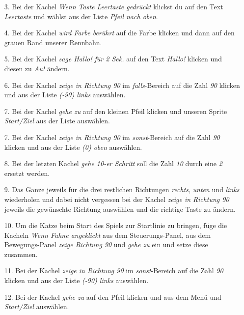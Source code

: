 \begin{itemize}
\item[3. ] Bei der Kachel \textit{Wenn Taste Leertaste gedrückt} klickst du auf den Text \textit{Leertaste} und w{\"a}hlst aus der Liste \textit{Pfeil nach oben}.
\item[4. ] Bei der Kachel \textit{wird Farbe berührt} auf die Farbe klicken und dann auf den grauen Rand unserer Rennbahn.
\item[5. ] Bei der Kachel \textit{sage Hallo! für 2 Sek.} auf den Text \textit{Hallo!} klicken und diesen zu \textit{Au!} ändern.
\item[6. ] Bei der Kachel \textit{zeige in Richtung 90} im \textit{falls}-Bereich auf die Zahl \textit{90} klicken und aus der Liste \textit{(-90) links} auswählen.
\item[7. ] Bei der Kachel \textit{gehe zu} auf den kleinen Pfeil klicken und unseren Sprite \textit{Start/Ziel} aus der Liste auswählen.
\item[7. ] Bei der Kachel \textit{zeige in Richtung 90} im \textit{sonst}-Bereich auf die Zahl \textit{90} klicken und aus der Liste \textit{(0) oben} auswählen.
\item[8. ] Bei der letzten Kachel \textit{gehe 10-er Schritt} soll die Zahl \textit{10} durch eine \textit{2} ersetzt werden.
\end{itemize}


\begin{itemize}
\item[9. ] Das Ganze jeweils für die drei restlichen Richtungen \textit{rechts}, \textit{unten} und \textit{links} wiederholen und dabei nicht vergessen bei der Kachel \textit{zeige in Richtung 90} jeweils die gewünschte Richtung auswählen und die richtige Taste zu ändern.
\end{itemize}


\begin{itemize}
\item[10. ] Um die Katze beim Start des Spiels zur Startlinie zu bringen, füge die Kacheln \textit{Wenn Fahne angeklickt} aus dem Steuerungs-Panel, aus dem Bewegungs-Panel \textit{zeige Richtung 90} und \textit{gehe zu} ein und setze diese zusammen.
\item[11. ] Bei der Kachel \textit{zeige in Richtung 90} im \textit{sonst}-Bereich auf die Zahl \textit{90} klicken und aus der Liste \textit{(-90) links} auswählen.
\item[12. ] Bei der Kachel \textit{gehe zu} auf den Pfeil klicken und aus dem Menü und \textit{Start/Ziel} auswählen.
\end{itemize}


